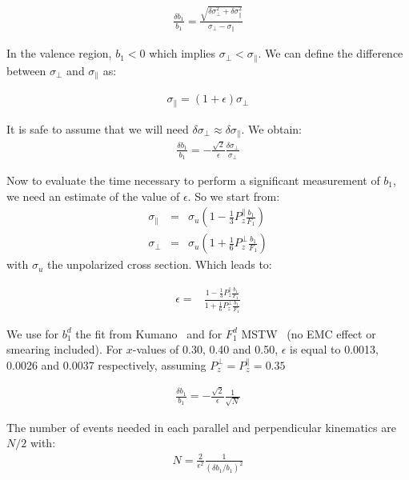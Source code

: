 \begin{eqnarray}
\frac{\delta b_1}{b_1} = \frac{\sqrt{\delta \sigma_{\perp}^2 + \delta \sigma_{\parallel}^2}}{\sigma_{\perp} - \sigma_{\parallel}} 
\label{none} 
\end{eqnarray}

In the valence region, $b_1 < 0$ which implies $\sigma_{\perp} < \sigma_{\parallel}$. We can define the difference between $\sigma_{\perp}$ and $\sigma_{\parallel}$ as:

\begin{eqnarray}
\sigma_{\parallel} = (1+\epsilon) \sigma_{\perp}
\label{none} 
\end{eqnarray}

It is safe to assume that we will need $\delta \sigma_{\perp} \approx \delta \sigma_{\parallel}$. We obtain:
\begin{eqnarray}
\frac{\delta b_1}{b_1} = - \frac{\sqrt{2}}{\epsilon} \frac{\delta \sigma_{\perp}}{\sigma_{\perp}} 
\label{none} 
\end{eqnarray}

Now to evaluate the time necessary to perform a significant measurement of $b_1$, we need an estimate of the value of $\epsilon$.  So we start from:
\begin{eqnarray}
\sigma_{\parallel} & = & \sigma_{u} (1 - \frac{1}{3} P_z^{\parallel} \frac{b_1}{F_1}) \\
\sigma_{\perp} & = & \sigma_{u} (1 + \frac{1}{6} P_z^{\perp} \frac{b_1}{F_1})
\label{none} 
\end{eqnarray}
%
with $\sigma_u$ the unpolarized cross section.  Which leads to:

\begin{eqnarray}
\epsilon = & \frac{1 - \frac{1}{3} P_z^{\parallel} \frac{b_1}{F_1}}{1 + \frac{1}{6} P_z^{\perp} \frac{b_1}{F_1}}
\label{EPSILON} 
\end{eqnarray}

We use for $b_1^d$ the fit from Kumano~\cite{Kumano:2010vz} and for $F_1^d$ MSTW~\cite{Martin:2009iq} (no EMC effect or smearing included). For $x$-values of 0.30, 0.40 and 0.50, $\epsilon$ is equal to 0.0013, 0.0026 and 0.0037 respectively, assuming $P_z^{\perp} = P_z^{\parallel} = 0.35$

\begin{eqnarray}
\frac{\delta b_1}{b_1} = - \frac{\sqrt{2}}{\epsilon} \frac{1}{\sqrt{N}} 
\label{none} 
\end{eqnarray}

The number of events needed in each parallel and perpendicular kinematics are $N/2$ with:
\begin{eqnarray}
N = \frac{2}{\epsilon^2} \frac{1}{(\delta b_1 / b_1)^2}
\label{none} 
\end{eqnarray}

